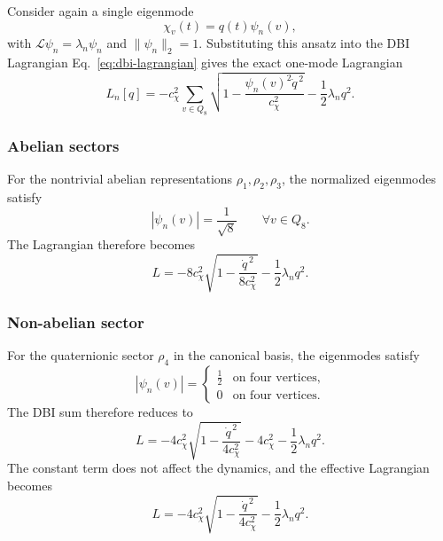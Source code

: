 \documentclass[11pt,a4paper]{article}
\begin{document}
    Consider again a single eigenmode
    \[
      \chi_v(t) = q(t)\psi_n(v),
    \]
    with $\mathcal{L}\psi_n = \lambda_n \psi_n$ and $\|\psi_n\|_2=1$.
    Substituting this ansatz into the DBI Lagrangian
    Eq.~\eqref{eq:dbi-lagrangian} gives the exact one-mode Lagrangian
    \begin{equation}
      L_n[q]
      =
      -c_\chi^2
      \sum_{v\in Q_8}
      \sqrt{1-\frac{\psi_n(v)^2\dot q^{\,2}}{c_\chi^2}}
      -
      \frac12\lambda_n q^2 .
    \end{equation}

    \subsubsection*{Abelian sectors}

      For the nontrivial abelian representations $\rho_1,\rho_2,\rho_3$,
      the normalized eigenmodes satisfy
      \[
        |\psi_n(v)| = \frac{1}{\sqrt{8}}
        \qquad
        \forall v\in Q_8 .
      \]
      The Lagrangian therefore becomes
      \begin{equation}
        L
        =
        -8c_\chi^2
        \sqrt{1-\frac{\dot q^{\,2}}{8c_\chi^2}}
        -
        \frac12\lambda_n q^2 .
      \end{equation}

    \subsubsection*{Non-abelian sector}

      For the quaternionic sector $\rho_4$ in the canonical basis,
      the eigenmodes satisfy
      \[
        |\psi_n(v)| =
        \begin{cases}
          \frac12 & \text{on four vertices}, \\
          0 & \text{on four vertices}.
        \end{cases}
      \]
      The DBI sum therefore reduces to
      \begin{equation}
        L
        =
        -4c_\chi^2
        \sqrt{1-\frac{\dot q^{\,2}}{4c_\chi^2}}
        -4c_\chi^2
        -
        \frac12\lambda_n q^2 .
      \end{equation}
      The constant term does not affect the dynamics, and the effective
      Lagrangian becomes
      \begin{equation}
        L
        =
        -4c_\chi^2
        \sqrt{1-\frac{\dot q^{\,2}}{4c_\chi^2}}
        -
        \frac12\lambda_n q^2 .
      \end{equation}
\end{document}
